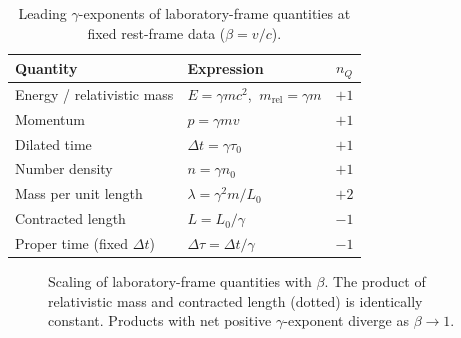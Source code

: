 \documentclass[11pt,a4paper]{article}
\theoremstyle{definition}
\theoremstyle{remark}
\newcommand{\mrel}{m_{\mathrm{rel}}}
\begin{document}
\begin{table}[h]
  \centering
  \caption{Leading $\gamma$-exponents of laboratory-frame quantities at fixed
  rest-frame data ($\beta=v/c$).}
  \label{tab:power}
  \begin{tabular}{@{}llc@{}}
    \toprule
    Quantity & Expression & $n_Q$ \\
    \midrule
    Energy / relativistic mass  & $E=\gamma mc^2$, $\ \mrel=\gamma m$ & $+1$ \\
    Momentum                    & $p=\gamma m v$                      & $+1$ \\
    Dilated time                & $\Delta t=\gamma\tau_0$             & $+1$ \\
    Number density              & $n=\gamma n_0$                      & $+1$ \\
    Mass per unit length        & $\lambda=\gamma^{2}m/L_0$           & $+2$ \\
    Contracted length           & $L=L_0/\gamma$                      & $-1$ \\
    Proper time (fixed $\Delta t$) & $\Delta\tau=\Delta t/\gamma$     & $-1$ \\
    \bottomrule
  \end{tabular}
\end{table}

\begin{figure}[h]
  \centering
  \caption{Scaling of laboratory-frame quantities with $\beta$. The product of
  relativistic mass and contracted length (dotted) is identically constant.
  Products with net positive $\gamma$-exponent diverge as $\beta\to1$.}
  \label{fig:scaling}
\end{figure}
\end{document}
